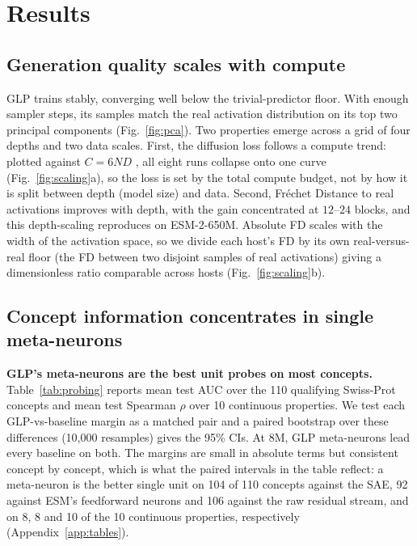 \documentclass{article}
\begin{document}
\section{Results}

\subsection{Generation quality scales with compute}
\label{sec:gen-quality}

GLP trains stably, converging well below the trivial-predictor floor. With enough sampler steps,
its samples match the real activation distribution on its top two principal components
(Fig.~\ref{fig:pca}). Two properties emerge across a grid of four depths and two
data scales. First, the diffusion loss follows a compute trend: plotted against $C{=}6ND$
\cite{kaplan2020}, all eight runs collapse onto one curve (Fig.~\ref{fig:scaling}a), so the
loss is set by the total compute budget, not by how it is split between depth (model size) and
data. Second, Fréchet Distance to real activations improves with depth, with the gain
concentrated at $12$--$24$ blocks,
and this depth-scaling reproduces on ESM-2-650M. Absolute FD scales with the width of the activation space, so we divide each host's FD by its own real-versus-real floor (the FD between two disjoint samples of real activations) giving a
dimensionless ratio comparable across hosts (Fig.~\ref{fig:scaling}b).




\subsection{Concept information concentrates in single meta-neurons}
\label{sec:probing-results}

\textbf{GLP's meta-neurons are the best unit probes on most concepts.} Table~\ref{tab:probing}
reports mean test AUC over the 110 qualifying Swiss-Prot concepts and mean test Spearman
$\rho$ over 10 continuous properties. We test each GLP-vs-baseline margin as a matched pair and a paired
bootstrap over these differences (10,000 resamples) gives the 95\% CIs. At 8M, GLP meta-neurons lead every baseline on
both. The margins are small in absolute terms but consistent concept by concept, which is
what the paired intervals in the table reflect: a meta-neuron is the better single unit on
104 of 110 concepts against the SAE, 92 against ESM's feedforward neurons and 106 against
the raw residual stream, and on 8, 8 and 10 of the 10 continuous properties, respectively
(Appendix~\ref{app:tables}).
\end{document}
